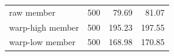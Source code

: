 \begin{table}[htbp]
\begin{tabular}{lrrr}
raw member & %
500 & %
79.69 & %
81.07 \\ %

warp-high member & %
500 & %
195.23 & %
197.55 \\ %

warp-low member & %
500 & %
168.98 & %
170.85 \\ %


\end{tabular}
\end{table}
